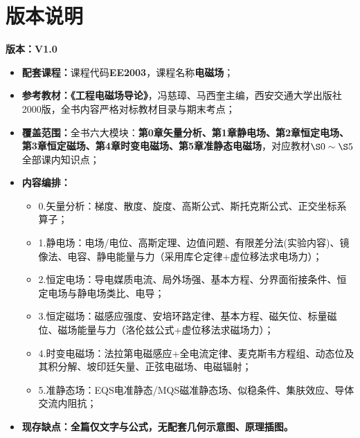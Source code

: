 \section*{版本说明}
\noindent\textbf{版本：V1.0}
\begin{itemize}
    \item \textbf{配套课程：}课程代码\textbf{EE2003}，课程名称\textbf{电磁场}；
    \item \textbf{参考教材：}\textbf{《工程电磁场导论》}，冯慈璋、马西奎主编，西安交通大学出版社2000版，全书内容严格对标教材目录与期末考点；
    \item \textbf{覆盖范围：}全书六大模块：\textbf{第0章矢量分析、第1章静电场、第2章恒定电场、第3章恒定磁场、第4章时变电磁场、第5章准静态电磁场}，对应教材$\S0\sim\S5$全部课内知识点；
    \item \textbf{内容编排：}
    \begin{itemize}
        \item 0.矢量分析：梯度、散度、旋度、高斯公式、斯托克斯公式、正交坐标系算子；
        \item 1.静电场：电场/电位、高斯定理、边值问题、有限差分法(实验内容)、镜像法、电容、静电能量与力（采用库仑定律+虚位移法求电场力）；
        \item 2.恒定电场：导电媒质电流、局外场强、基本方程、分界面衔接条件、恒定电场与静电场类比、电导；
        \item 3.恒定磁场：磁感应强度、安培环路定律、基本方程、磁矢位、标量磁位、磁场能量与力（洛伦兹公式+虚位移法求磁场力）；
        \item 4.时变电磁场：法拉第电磁感应+全电流定律、麦克斯韦方程组、动态位及其积分解、坡印廷矢量、正弦电磁场、电磁辐射；
        \item 5.准静态场：EQS电准静态/MQS磁准静态场、似稳条件、集肤效应、导体交流内阻抗；
    \end{itemize}
    \item \textbf{现存缺点：全篇仅文字与公式，无配套几何示意图、原理插图。}
\end{itemize}